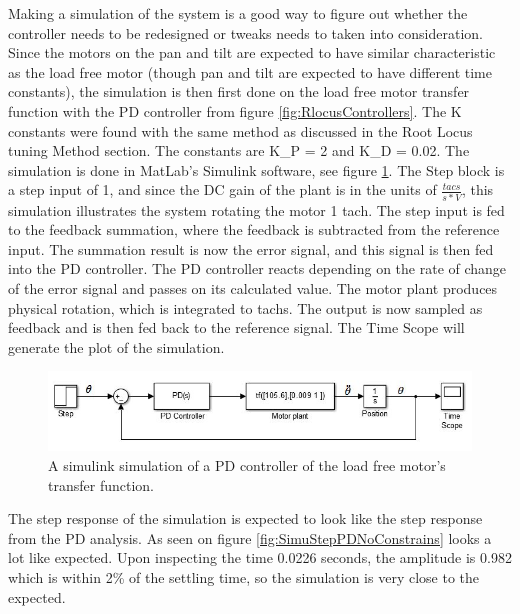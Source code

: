 Making a simulation of the system is a good way to figure out whether the controller needs to be redesigned or tweaks needs to taken into consideration. Since the motors on the pan and tilt are expected to have similar characteristic as the load free motor (though pan and tilt are expected to have different time constants), the simulation is then first done on the load free motor transfer function with the PD controller from figure \ref{fig:RlocusControllers}. The K constants were found with the same method as discussed in the Root Locus tuning Method section. The constants are K\_P = 2 and K\_D = 0.02.
The simulation is done in MatLab’s Simulink software, see figure \ref{fig:Simulinkmodel}. The Step block is a step input of 1, and since the DC gain of the plant is in the units of $\frac{tacs}{s*V}$, this simulation illustrates the system rotating the motor 1 tach. The step input is fed to the feedback summation, where the feedback is subtracted from the reference input. The summation result is now the error signal, and this signal is then fed into the PD controller. The PD controller reacts depending on the rate of change of the error signal and passes on its calculated value. The motor plant produces physical rotation, which is integrated to tachs. The output is now sampled as feedback and is then fed back to the reference signal. The Time Scope will generate the plot of the simulation.

\begin{figure}[h!]
\centering
\includegraphics[scale=0.7]{Billeder/simulinkmodel.jpg}
\caption{ A simulink simulation of a PD controller of the load free motor’s transfer function. }
\label{fig:Simulinkmodel}
\end{figure}

The step response of the simulation is expected to look like the step response from the PD analysis. As seen on figure \ref{fig:SimuStepPDNoConstrains} looks a lot like expected. Upon inspecting the time 0.0226 seconds, the amplitude is 0.982 which is within 2\% of the settling time, so the simulation is very close to the expected.

